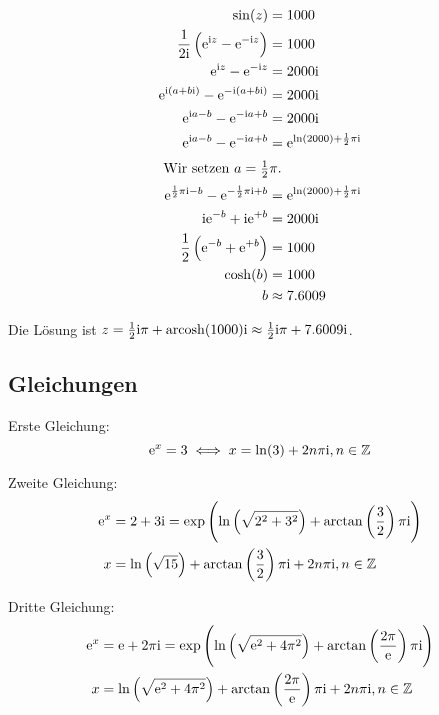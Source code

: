 \begin{align*}
	\sin(z) &= 1000 \\
	\frac 1{2 \ii} \del{\ee^{\ii z} - \ee^{-\ii z}} &= 1000 \\
	\ee^{\ii z} - \ee^{-\ii z} &= 2000 \ii \\
	\ee^{\ii \del{a + b \ii}} - \ee^{-\ii \del{a + b \ii}} &= 2000 \ii \\
	\ee^{\ii a - b} - \ee^{-\ii a + b} &= 2000 \ii \\
	\ee^{\ii a - b} - \ee^{-\ii a + b} &= \ee^{\ln(2000) + \half \pi \ii} \\
	\intertext{
		Wir setzen $a = \half \pi$.
	}
	\ee^{\half \pi \ii - b} - \ee^{-\half \pi \ii + b} &= \ee^{\ln(2000) + \half \pi \ii} \\
	\ii \ee^{- b} + \ii \ee^{+ b} &= 2000 \ii \\
	\half \del{\ee^{- b} + \ee^{+ b}} &= 1000 \\
	\cosh(b) &= 1000 \\
		   b &\approx 7.6009
\end{align*}

Die Lösung ist $z = \frac 12 \mathrm i \pi + \operatorname{arcosh}(1000) \mathrm i \approx \frac 12 \mathrm i \pi +
7.6009 \mathrm i$.

\subsection{Gleichungen}

Erste Gleichung:
\[
	\mathrm e^x = 3
	\iff
	x = \ln(3) + 2 n \pi \mathrm i, n \in \mathbb Z \\
\]

Zweite Gleichung:
\begin{align*}
	\ee^{x} &= 2 + 3 \ii
	= \exp\del{\ln\del{\sqrt{2^2 + 3^2}} + \arctan\del{\frac 32} \pi \ii} \\
	x &= \ln\del{\sqrt{15}} + \arctan\del{\frac 32} \pi \ii + 2 n \pi \ii, n \in \Z
\end{align*}

Dritte Gleichung:
\begin{align*}
	\ee^x &= \ee + 2 \pi \ii
 = \exp\del{\ln\del{\sqrt{\ee^2 + 4 \pi^2}} + \arctan\del{\frac{2 \pi}{\ee}} \pi \ii} \\
 x &= \ln\del{\sqrt{\ee^2 + 4 \pi^2}} + \arctan\del{\frac{2 \pi}{\ee}} \pi \ii + 2 n \pi \ii, n \in \Z
\end{align*}

%
%



